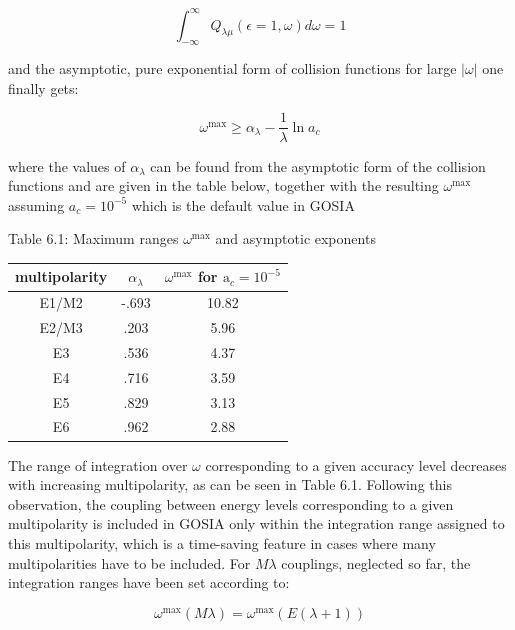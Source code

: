 \documentclass[10pt]{article}
\begin{document}
\begin{equation*}
\int_{-\infty}^{\infty} Q_{\lambda \mu}(\epsilon=1, \omega) d \omega=1 \tag{6.2}
\end{equation*}


and the asymptotic, pure exponential form of collision functions for large $|\omega|$ one finally gets:


\begin{equation*}
\omega^{\max } \geq \alpha_{\lambda}-\frac{1}{\lambda} \ln a_{c} \tag{6.3}
\end{equation*}


where the values of $\alpha_{\lambda}$ can be found from the asymptotic form of the collision functions and are given in the table below, together with the resulting $\omega^{\max }$ assuming $a_{c}=10^{-5}$ which is the default value in GOSIA

Table 6.1: Maximum ranges $\omega^{\max }$ and asymptotic exponents

\begin{center}
\begin{tabular}{|c|c|c|}
\hline
multipolarity & $\alpha_{\lambda}$ & $\omega^{\max }$ for $\mathrm{a}_{c}=10^{-5}$ \\
\hline
E1/M2 & -.693 & 10.82 \\
\hline
E2/M3 & .203 & 5.96 \\
\hline
E3 & .536 & 4.37 \\
\hline
E4 & .716 & 3.59 \\
\hline
E5 & .829 & 3.13 \\
\hline
E6 & .962 & 2.88 \\
\hline
\end{tabular}
\end{center}

The range of integration over $\omega$ corresponding to a given accuracy level decreases with increasing multipolarity, as can be seen in Table 6.1. Following this observation, the coupling between energy levels corresponding to a given multipolarity is included in GOSIA only within the integration range assigned to this multipolarity, which is a time-saving feature in cases where many multipolarities have to be included. For $M \lambda$ couplings, neglected so far, the integration ranges have been set according to:


\begin{equation*}
\omega^{\max }(M \lambda)=\omega^{\max }(E(\lambda+1)) \tag{6.4}
\end{equation*}
\end{document}
